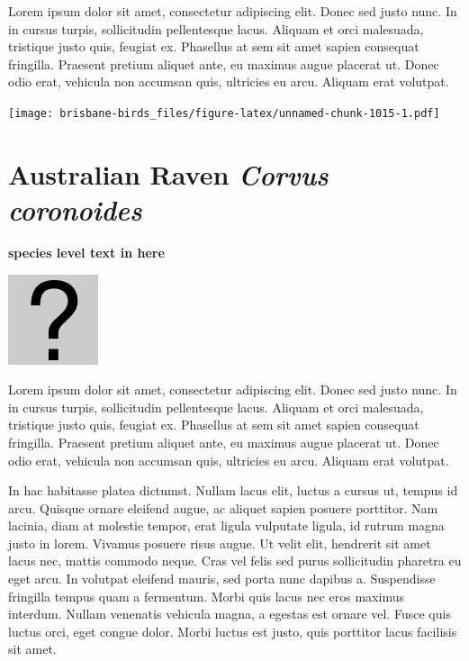 \documentclass[]{book}
\let\origfigure\figure
\let\endorigfigure\endfigure
\renewenvironment{figure}[1][2] {
  \expandafter\origfigure\expandafter[H]
} {
  \endorigfigure
}
\begin{document}
Lorem ipsum dolor sit amet, consectetur adipiscing elit. Donec sed justo
nunc. In in cursus turpis, sollicitudin pellentesque lacus. Aliquam et
orci malesuada, tristique justo quis, feugiat ex. Phasellus at sem sit
amet sapien consequat fringilla. Praesent pretium aliquet ante, eu
maximus augue placerat ut. Donec odio erat, vehicula non accumsan quis,
ultricies eu arcu. Aliquam erat volutpat.

\texttt{[image: brisbane-birds\_files/figure-latex/unnamed-chunk-1015-1.pdf]}

\section{\texorpdfstring{Australian Raven \emph{Corvus
coronoides}}{Australian Raven Corvus coronoides}}\label{australian-raven-corvus-coronoides}

\textbf{species level text in here}

\begin{figure}
\centering
\includegraphics{assets/missing.png}
\caption{No image for species}
\end{figure}

Lorem ipsum dolor sit amet, consectetur adipiscing elit. Donec sed justo
nunc. In in cursus turpis, sollicitudin pellentesque lacus. Aliquam et
orci malesuada, tristique justo quis, feugiat ex. Phasellus at sem sit
amet sapien consequat fringilla. Praesent pretium aliquet ante, eu
maximus augue placerat ut. Donec odio erat, vehicula non accumsan quis,
ultricies eu arcu. Aliquam erat volutpat.

In hac habitasse platea dictumst. Nullam lacus elit, luctus a cursus ut,
tempus id arcu. Quisque ornare eleifend augue, ac aliquet sapien posuere
porttitor. Nam lacinia, diam at molestie tempor, erat ligula vulputate
ligula, id rutrum magna justo in lorem. Vivamus posuere risus augue. Ut
velit elit, hendrerit sit amet lacus nec, mattis commodo neque. Cras vel
felis sed purus sollicitudin pharetra eu eget arcu. In volutpat eleifend
mauris, sed porta nunc dapibus a. Suspendisse fringilla tempus quam a
fermentum. Morbi quis lacus nec eros maximus interdum. Nullam venenatis
vehicula magna, a egestas est ornare vel. Fusce quis luctus orci, eget
congue dolor. Morbi luctus est justo, quis porttitor lacus facilisis sit
amet.
\end{document}
